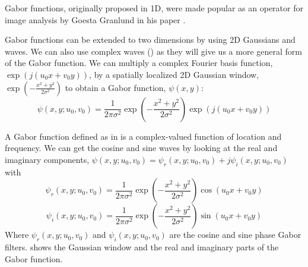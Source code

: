 Gabor functions, originally proposed in 1D, were made popular as an operator for image analysis by Goesta Granlund in his paper  \cite{GRANLUND1978155}.

Gabor functions can be extended to two dimensions by using 2D Gaussians and waves. We can also use complex waves (\chap{\ref{chapter:fourier_analysis}}) as they will give us a more general form of the Gabor function. We can  multiply a complex Fourier basis function, $\exp{ \left(j  \left(u_0 x + v_0 y \right)  \right)}$,  by a spatially localized 2D Gaussian window, $\exp{\left(-\frac{x^2 + y^2}{2 \sigma^2} \right) }$ to obtain a Gabor function,
$\psi(x,y)$:
\begin{equation}
	\psi(x,y;u_0,v_0) = \frac{1}{2\pi \sigma^2} \exp{\left(-\frac{x^2 + y^2}{2 \sigma^2} \right)} \exp{ \left( j \left(u_0 x + v_0 y \right) \right)}
	\label{eq:gaborcomplexfilter}
\end{equation}

A Gabor function defined as in \eqn{\ref{eq:gaborcomplexfilter}} is a complex-valued function of location and frequency. We can get the cosine and sine waves by looking at the real and imaginary components, $\psi(x,y;u_0,v_0) =  \psi_r(x,y;u_0,v_0) + j \psi_i(x,y;u_0,v_0)$ with
\begin{equation}
	\psi_r(x,y;u_0,v_0) = \frac{1}{2\pi \sigma^2} \exp{\left(-\frac{x^2 + y^2}{2 \sigma^2} \right)} \cos{ \left(u_0 x + v_0 y \right) }
\end{equation}
\begin{equation}
	\psi_i(x,y;u_0,v_0) = \frac{1}{2\pi \sigma^2} \exp{\left(-\frac{x^2 + y^2}{2 \sigma^2} \right)} \sin{ \left(u_0 x + v_0 y \right) }
\end{equation}
Where $\psi_r(x,y;u_0,v_0)$ and $\psi_i(x,y;u_0,v_0)$ are the cosine and sine phase Gabor filters. \Fig{\ref{fig:gabors}} shows the Gaussian window and the real and imaginary parts of the Gabor function.


%
%





